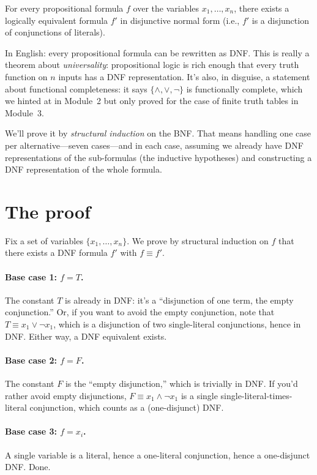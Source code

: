 \documentclass[11pt]{article}
\begin{document}
\begin{theorem}
For every propositional formula $f$ over the variables $x_1, \ldots, x_n$, there exists a logically equivalent formula $f'$ in disjunctive normal form (i.e., $f'$ is a disjunction of conjunctions of literals).
\end{theorem}

In English: every propositional formula can be rewritten as DNF. This is really a theorem about \emph{universality}: propositional logic is rich enough that every truth function on $n$ inputs has a DNF representation. It's also, in disguise, a statement about functional completeness: it says $\{\wedge, \vee, \lnot\}$ is functionally complete, which we hinted at in Module~2 but only proved for the case of finite truth tables in Module~3.

We'll prove it by \emph{structural induction} on the BNF. That means handling one case per alternative---seven cases---and in each case, assuming we already have DNF representations of the sub-formulas (the inductive hypotheses) and constructing a DNF representation of the whole formula.

\section*{The proof}

Fix a set of variables $\{x_1, \ldots, x_n\}$. We prove by structural induction on $f$ that there exists a DNF formula $f'$ with $f \equiv f'$.

\paragraph{Base case 1: $f = T$.} The constant $T$ is already in DNF: it's a ``disjunction of one term, the empty conjunction.'' Or, if you want to avoid the empty conjunction, note that $T \equiv x_1 \vee \lnot x_1$, which is a disjunction of two single-literal conjunctions, hence in DNF. Either way, a DNF equivalent exists.

\paragraph{Base case 2: $f = F$.} The constant $F$ is the ``empty disjunction,'' which is trivially in DNF. If you'd rather avoid empty disjunctions, $F \equiv x_1 \wedge \lnot x_1$ is a single single-literal-times-literal conjunction, which counts as a (one-disjunct) DNF.

\paragraph{Base case 3: $f = x_i$.} A single variable is a literal, hence a one-literal conjunction, hence a one-disjunct DNF. Done.
\end{document}
